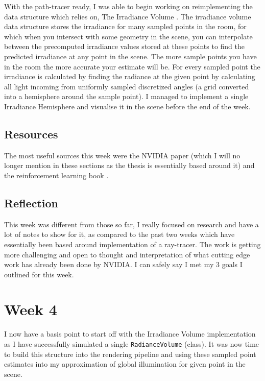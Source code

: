 \documentclass[conference]{IEEEtran}
\begin{document}
With the path-tracer ready, I was able to begin working on reimplementing the data structure which \cite{dahm2017learning} relies on, The Irradiance Volume \cite{greger1998irradiance}. The irradiance volume data structure stores the irradiance for many sampled points in the room, for which when you intersect with some geometry in the scene, you can interpolate between the precomputed irradiance values stored at these points to find the predicted irradiance at any point in the scene. The more sample points you have in the room the more accurate your estimate will be. For every sampled point the irradiance is calculated by finding the radiance at the given point by calculating all light incoming from uniformly sampled discretized angles (a grid converted into a hemisphere around the sample point). I managed to implement a single Irradiance Hemisphere and visualise it in the scene before the end of the week.

\subsection{Resources}
The most useful sources this week were the NVIDIA paper \cite{dahm2017learning} (which I will no longer mention in these sections as the thesis is essentially based around it) and the reinforcement learning book \cite{reinforcement-learning-book}.

\subsection{Reflection}
This week was different from those so far, I really focused on research and have a lot of notes to show for it, as compared to the past two weeks which have essentially been based around implementation of a ray-tracer. The work is getting more challenging and open to thought and interpretation of what cutting edge work has already been done by NVIDIA. I can safely say I met my 3 goals I outlined for this week.

\section*{Week 4}
I now have a basis point to start off with the Irradiance Volume \cite{greger1998irradiance} implementation as I have successfully simulated a single \verb|RadianceVolume| (class). It was now time to build this structure into the rendering pipeline and using these sampled point estimates into my approximation of global illumination for given point in the scene.
\end{document}
